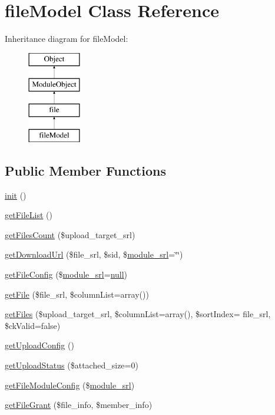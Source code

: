 \hypertarget{classfileModel}{}\section{file\+Model Class Reference}
\label{classfileModel}
Inheritance diagram for file\+Model\+:\begin{figure}[H]
\begin{center}
\leavevmode
\includegraphics[height=4.000000cm]{classfileModel}
\end{center}
\end{figure}
\subsection*{Public Member Functions}
\begin{DoxyCompactItemize}
\item 
\hyperlink{classfileModel_a5dd9542d5c0ed61a7dd0158900ff5c92}{init} ()
\item 
\hyperlink{classfileModel_ad2b29057d5e61a15cb2caf794fc12291}{get\+File\+List} ()
\item 
\hyperlink{classfileModel_a37f83c04ce8adc09f576b94e04264f5b}{get\+Files\+Count} (\$upload\+\_\+target\+\_\+srl)
\item 
\hyperlink{classfileModel_ad626512a63e99f97d0e5a6fac7dae8c8}{get\+Download\+Url} (\$file\+\_\+srl, \$sid, \$\hyperlink{ko_8install_8php_a370bb6450fab1da3e0ed9f484a38b761}{module\+\_\+srl}=\char`\"{}\char`\"{})
\item 
\hyperlink{classfileModel_a81beeda11f761f561adb60ebc72d6187}{get\+File\+Config} (\$\hyperlink{ko_8install_8php_a370bb6450fab1da3e0ed9f484a38b761}{module\+\_\+srl}=\hyperlink{modernizr_8min_8js_a286f9ec831c5e676eeb493248eab9575}{null})
\item 
\hyperlink{classfileModel_a1475f2eb6cc740bf7f5ef67a4654fb24}{get\+File} (\$file\+\_\+srl, \$column\+List=array())
\item 
\hyperlink{classfileModel_a149c4f1e8710ec09c7dab5284b72bd48}{get\+Files} (\$upload\+\_\+target\+\_\+srl, \$column\+List=array(), \$sort\+Index= \textquotesingle{}file\+\_\+srl\textquotesingle{}, \$ck\+Valid=false)
\item 
\hyperlink{classfileModel_a0d268e1f840c7495de96ed511c7053fc}{get\+Upload\+Config} ()
\item 
\hyperlink{classfileModel_a63c3d6b41db33e55521cd3f0b10ab493}{get\+Upload\+Status} (\$attached\+\_\+size=0)
\item 
\hyperlink{classfileModel_aefe867916bce4a5f3451bb9afc464844}{get\+File\+Module\+Config} (\$\hyperlink{ko_8install_8php_a370bb6450fab1da3e0ed9f484a38b761}{module\+\_\+srl})
\item 
\hyperlink{classfileModel_a129e251c2a4ed575126c902a64ed3f59}{get\+File\+Grant} (\$file\+\_\+info, \$member\+\_\+info)
\end{DoxyCompactItemize}
